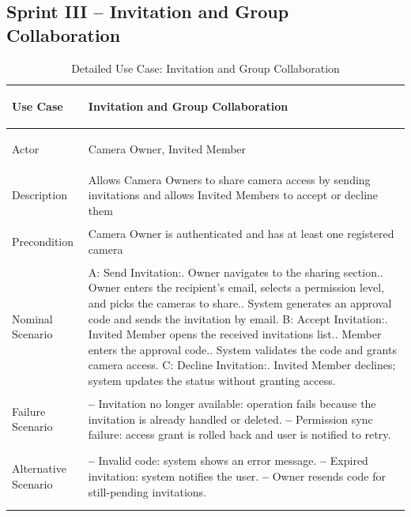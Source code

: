 \documentclass[12pt,a4paper,oneside]{report}
\newlength{\TblTwoKeyW}
\newlength{\TblTwoValW}
\begin{document}
\subsection*{Sprint III -- Invitation and Group Collaboration}
{\small
\begin{longtable}{|>{\bfseries\raggedright\arraybackslash}p{\TblTwoKeyW}|>{\raggedright\arraybackslash}p{\TblTwoValW}|}
\hline
Use Case    & Invitation and Group Collaboration \\ \hline
Actor       & Camera Owner, Invited Member \\ \hline
Description & Allows Camera Owners to share camera access by sending invitations and allows Invited Members to accept or decline them \\ \hline
Precondition & Camera Owner is authenticated and has at least one registered camera \\ \hline
Nominal Scenario &
A: Send Invitation:\newline
1. Owner navigates to the sharing section.\newline
2. Owner enters the recipient's email, selects a permission level, and picks the cameras to share.\newline
3. System generates an approval code and sends the invitation by email.\newline
B: Accept Invitation:\newline
1. Invited Member opens the received invitations list.\newline
2. Member enters the approval code.\newline
3. System validates the code and grants camera access.\newline
C: Decline Invitation:\newline
1. Invited Member declines; system updates the status without granting access. \\ \hline
Failure Scenario &
\textbf{--} Invitation no longer available: operation fails because the invitation is already handled or deleted.\newline
\textbf{--} Permission sync failure: access grant is rolled back and user is notified to retry. \\ \hline
Alternative Scenario &
\textbf{--} Invalid code: system shows an error message.\newline
\textbf{--} Expired invitation: system notifies the user.\newline
\textbf{--} Owner resends code for still-pending invitations. \\ \hline
\caption{Detailed Use Case: Invitation and Group Collaboration}
\label{tab:app_uc_invitations}
\end{longtable}
}
\end{document}
